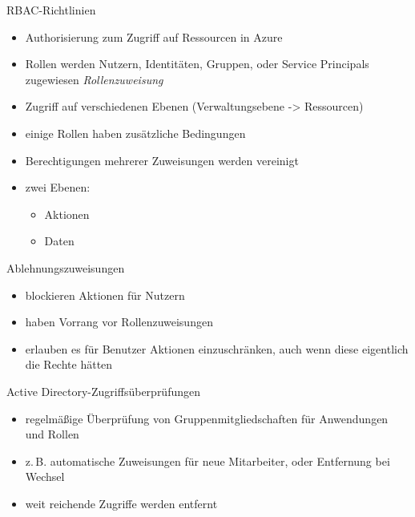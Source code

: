 \begin{flashcard}[Definition]{RBAC-Richtlinien}
  \begin{itemize}
    \item Authorisierung zum Zugriff auf Ressourcen in Azure
    \item Rollen werden Nutzern, Identitäten, Gruppen, oder Service Principals zugewiesen\newline
      \emph{Rollenzuweisung}
    \item Zugriff auf verschiedenen Ebenen (Verwaltungsebene -> Ressourcen)
    \item einige Rollen haben zusätzliche Bedingungen
    \item Berechtigungen mehrerer Zuweisungen werden vereinigt
    \item zwei Ebenen:
      \begin{itemize}
        \item Aktionen
        \item Daten
      \end{itemize}
  \end{itemize}
\end{flashcard}

\begin{flashcard}[Definition]{Ablehnungszuweisungen}
  \begin{itemize}
    \item blockieren Aktionen für Nutzern
    \item haben Vorrang vor Rollenzuweisungen
    \item erlauben es für Benutzer Aktionen einzuschränken,\newline
      auch wenn diese eigentlich die Rechte hätten
  \end{itemize}
\end{flashcard}

\begin{flashcard}[Definition]{Active Directory-Zugriffsüberprüfungen}
  \begin{itemize}
    \item regelmäßige Überprüfung von Gruppenmitgliedschaften für Anwendungen und Rollen
    \item z.\,B. automatische Zuweisungen für neue Mitarbeiter, oder Entfernung bei Wechsel
    \item weit reichende Zugriffe werden entfernt
  \end{itemize}
\end{flashcard}

